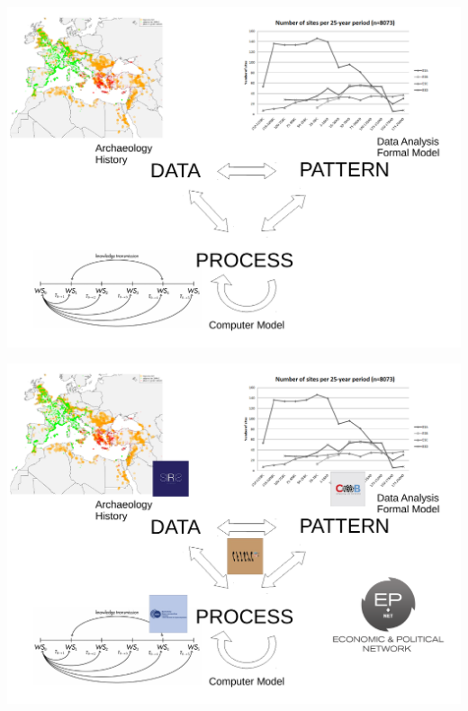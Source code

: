 \documentclass[12pt, notes=show]{beamer}
\begin{document}
\begin{frame}
    \begin{center}
	\includegraphics[width=\textwidth]{images/approach.pdf}		
    \end{center}
    
\end{frame}

\begin{frame}
    \begin{center}
	\includegraphics[width=\textwidth]{images/approach2.pdf}		
    \end{center}
    
\end{frame}
\end{document}
